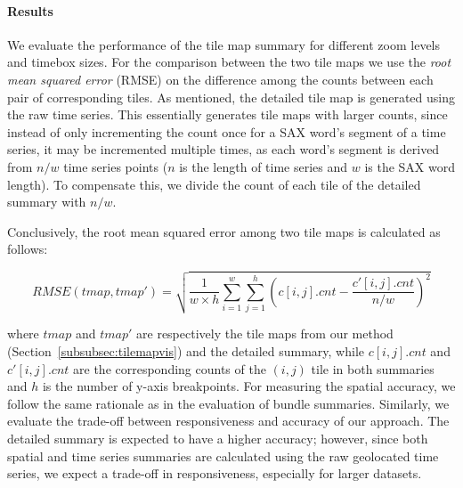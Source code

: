 \paragraph{Results} We evaluate the performance of the tile map summary for different zoom levels and timebox sizes. For the comparison between the two tile maps we use the {\em root mean squared error} (RMSE) on the difference among the counts between each pair of corresponding tiles. As mentioned, the detailed tile map is generated using the raw time series. This essentially generates tile maps with larger counts, since instead of only incrementing the count once for a SAX word's segment of a time series, it may be incremented multiple times, as each word's segment is derived from $n/w$ time series points ($n$ is the length of time series and $w$ is the SAX word length). To compensate this, we divide the count of each tile of the detailed summary with $n/w$.

Conclusively, the root mean squared error among two tile maps is calculated as follows:

\begin{equation} \label{eq:rmse}
RMSE(tmap, tmap') = \sqrt{\frac{1}{w \times h}\displaystyle \sum_{i=1}^{w} \sum_{j=1}^{h}(c[i,j].cnt - \frac{c'[i,j].cnt}{n/w})^2} 
\end{equation}

\noindent where $tmap$ and $tmap'$ are respectively the tile maps from our method (Section~\ref{subsubsec:tilemapvis}) and the detailed summary, while $c[i,j].cnt$ and $c'[i,j].cnt$ are the corresponding counts of the $(i,j)$ tile in both summaries and $h$ is the number of y-axis breakpoints. For measuring the spatial accuracy, we follow the same rationale as in the evaluation of bundle summaries. Similarly, we evaluate the trade-off between responsiveness and accuracy of our approach. The detailed summary is expected to have a higher accuracy; however, since both spatial and time series summaries are calculated using the raw geolocated time series, we expect a trade-off in responsiveness, especially for larger datasets.

